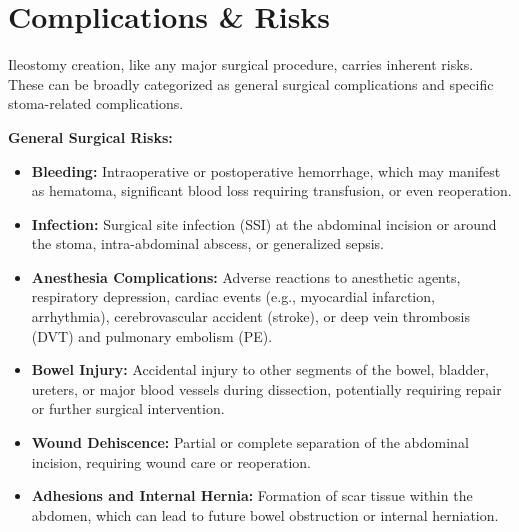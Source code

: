 \section*{Complications \& Risks}
Ileostomy creation, like any major surgical procedure, carries inherent risks. These can be broadly categorized as general surgical complications and specific stoma-related complications.

\textbf{General Surgical Risks:}
\begin{itemize}
  \item \textbf{Bleeding:} Intraoperative or postoperative hemorrhage, which may manifest as hematoma, significant blood loss requiring transfusion, or even reoperation.
  
  \item \textbf{Infection:} Surgical site infection (SSI) at the abdominal incision or around the stoma, intra-abdominal abscess, or generalized sepsis.
  
  \item \textbf{Anesthesia Complications:} Adverse reactions to anesthetic agents, respiratory depression, cardiac events (e.g., myocardial infarction, arrhythmia), cerebrovascular accident (stroke), or deep vein thrombosis (DVT) and pulmonary embolism (PE).
  
  \item \textbf{Bowel Injury:} Accidental injury to other segments of the bowel, bladder, ureters, or major blood vessels during dissection, potentially requiring repair or further surgical intervention.
  
  \item \textbf{Wound Dehiscence:} Partial or complete separation of the abdominal incision, requiring wound care or reoperation.
  
  \item \textbf{Adhesions and Internal Hernia:} Formation of scar tissue within the abdomen, which can lead to future bowel obstruction or internal herniation.
\end{itemize}

